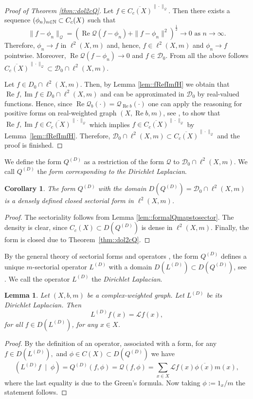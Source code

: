 \documentclass[a4paper,11pt]{amsart}
\newtheorem{lemma}[theorem]{Lemma}
\newtheorem{corollary}[theorem]{Corollary}
\theoremstyle{definition}
\renewcommand{\Re}{\operatorname{Re}}%
\renewcommand{\Im}{\operatorname{Im}}%
\renewcommand{\L}{\mathcal{L}}
\newcommand{\D}{\mathcal{D}}
\newcommand{\Q}{\mathcal{Q}}
\begin{document}
\begin{proof}[Proof of Theorem \ref{thm::dol2cQ}]
Let $f\in \overline{C_c(X)}^{\|\cdot\|_\mathcal Q}$. Then there exists a sequence  $(\phi_n)_{n\in \Bbb N}\subset C_c(X)$ such that
$$
\|f-\phi_n\|_\mathcal Q=(\Re \mathcal Q(f-\phi_n)+\|f-\phi_n\|^2)^{\frac{1}{2}}\to 0 \mbox{ as }n\to\infty.
$$
Therefore, $\phi_n\to f$ in $\ell^2(X,m)$ and, hence, $f\in \ell^2(X,m)$ and $\phi_n\to f$ pointwise. Moreover, $\Re \mathcal Q(f-\phi_n)\to 0$ and $f\in \mathcal D_0$. From all the above follows $\overline{C_c(X)}^{\|\cdot\|_\mathcal Q}\subset \mathcal D_0\cap \ell^2(X,m)$.

Let $f\in D_0\cap \ell^2(X,m)$. Then, by Lemma \ref{lem::fRefImfH} we obtain that $\Re f,\Im f \in D_0\cap \ell^2(X,m)$ and can be approximated in $\D_0$ by real-valued functions. Hence, since $\Re \Q_b(\cdot)=\Q_{\Re b}(\cdot)$ one can apply the reasoning for positive forms on real-weighted graph $(X,\Re b,m)$, see  \cite[proof of Theorem 1.19]{KellerLenzWojcBook}, to show that $\Re f,\Im f \in \overline{C_c(X)}^{\|\cdot\|_\mathcal Q}$ which implies $f \in \overline{C_c(X)}^{\|\cdot\|_\mathcal Q}$ by Lemma~\ref{lem::fRefImfH}. Therefore, $ \mathcal D_0\cap \ell^2(X,m)\subset\overline{C_c(X)}^{\|\cdot\|_\mathcal Q}$ and the proof is finished.


\end{proof}
We define the form $Q^{(D)}$ as a restriction of the form $\Q$ to $\mathcal D_0\cap \ell^2(X,m)$. We call $Q^{(D)}$ the {\em form corresponding to the Dirichlet Laplacian}.
\begin{corollary}
The form $Q^{(D)}$ with the domain $D(Q^{(D)})=\mathcal D_0\cap \ell^2(X,m)$ is a densely defined closed sectorial form in $\ell^2(X,m)$.
\end{corollary}
\begin{proof}
The sectoriality follows from Lemma \ref{lem::formalQmapstosector}. The density is clear, since $C_c(X)\subset D(Q^{(D)})$ is dense in $\ell^2(X,m)$. Finally, the form is closed due to Theorem~\ref{thm::dol2cQ}.
\end{proof}


By the general theory of sectorial forms and operators \cite{Kato}, the form $Q^{(D)}$ defines a unique $m$-sectorial operator $L^{(D)}$ with a domain $D(L^{(D)})\subset D(Q^{(D)})$, see \cite[p. 322, Theorem 2.1]{Kato}.  We call the operator $L^{(D)}$ the {\em Dirichlet Laplacian}.


\begin{lemma}\label{lem::LK=mathcalL}
Let $(X,b,m)$ be a complex-weighted graph. Let $L^{(D)}$ be its Dirichlet Laplacian. Then
$$
L^{(D)}f(x)=\mathcal Lf(x),
$$
for all $f\in D(L^{(D)})$, for any $x\in X$.

\end{lemma}
\begin{proof}
 By the definition of an operator, associated with a form, for any $f\in D(L^{(D)}),$ and $\phi\in C(X)\subset D(Q^{(D)})$ we have 
$$
(L^{(D)}f\;\mid\; \phi)=Q^{(D)}(f,\phi)=\mathcal Q(f,\phi)=\sum_{x\in X}\L f(x)\overline {\phi(x)}m(x),
$$
where the last equality is due to the Green's formula. Now taking $\phi:=1_x/m$ the statement follows.
\end{proof}
\end{document}
